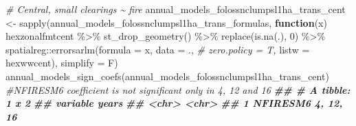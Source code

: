\documentclass[10pt,landscape,a3paper]{article}
\newenvironment{Shaded}{\begin{snugshade}}{\end{snugshade}}
\newcommand{\AttributeTok}[1]{\textcolor[rgb]{0.77,0.63,0.00}{#1}}
\newcommand{\CommentTok}[1]{\textcolor[rgb]{0.56,0.35,0.01}{\textit{#1}}}
\newcommand{\ControlFlowTok}[1]{\textcolor[rgb]{0.13,0.29,0.53}{\textbf{#1}}}
\newcommand{\DecValTok}[1]{\textcolor[rgb]{0.00,0.00,0.81}{#1}}
\newcommand{\DocumentationTok}[1]{\textcolor[rgb]{0.56,0.35,0.01}{\textbf{\textit{#1}}}}
\newcommand{\FunctionTok}[1]{\textcolor[rgb]{0.00,0.00,0.00}{#1}}
\newcommand{\NormalTok}[1]{#1}
\newcommand{\OtherTok}[1]{\textcolor[rgb]{0.56,0.35,0.01}{#1}}
\newcommand{\SpecialCharTok}[1]{\textcolor[rgb]{0.00,0.00,0.00}{#1}}
\begin{document}
\begin{Shaded}
\begin{Highlighting}[]
\CommentTok{\# Central, small clearings \textasciitilde{} fire}
\NormalTok{annual\_models\_folossnclumpsl1ha\_trans\_cent }\OtherTok{\textless{}{-}} \FunctionTok{sapply}\NormalTok{(annual\_models\_folossnclumpsl1ha\_trans\_formulas,}
                        \ControlFlowTok{function}\NormalTok{(x)}
\NormalTok{                          hexzonalfmtcent }\SpecialCharTok{\%\textgreater{}\%}
                          \FunctionTok{st\_drop\_geometry}\NormalTok{() }\SpecialCharTok{\%\textgreater{}\%}
                          \FunctionTok{replace}\NormalTok{(}\FunctionTok{is.na}\NormalTok{(.), }\DecValTok{0}\NormalTok{) }\SpecialCharTok{\%\textgreater{}\%}
\NormalTok{                          spatialreg}\SpecialCharTok{::}\FunctionTok{errorsarlm}\NormalTok{(}\AttributeTok{formula =}\NormalTok{ x,}
                                                 \AttributeTok{data =}\NormalTok{ ., }\CommentTok{\# zero.policy = T,}
                                                 \AttributeTok{listw =}\NormalTok{ hexwwcent),}
                        \AttributeTok{simplify =}\NormalTok{ F)}
\FunctionTok{annual\_models\_sign\_coefs}\NormalTok{(annual\_models\_folossnclumpsl1ha\_trans\_cent) }\CommentTok{\#NFIRESM6 coefficient is not significant only in 4, 12 and 16}
\DocumentationTok{\#\# \# A tibble: 1 x 2}
\DocumentationTok{\#\#   variable years    }
\DocumentationTok{\#\#   \textless{}chr\textgreater{}    \textless{}chr\textgreater{}    }
\DocumentationTok{\#\# 1 NFIRESM6 4, 12, 16}


\end{Highlighting}
\end{Shaded}
\end{document}
